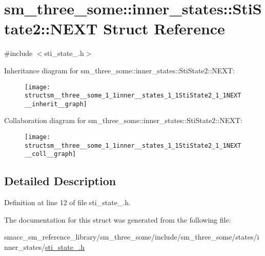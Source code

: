 \hypertarget{structsm__three__some_1_1inner__states_1_1StiState2_1_1NEXT}{}\section{sm\+\_\+three\+\_\+some\+:\+:inner\+\_\+states\+:\+:Sti\+State2\+:\+:N\+E\+XT Struct Reference}
\label{structsm__three__some_1_1inner__states_1_1StiState2_1_1NEXT}


{\ttfamily \#include $<$sti\+\_\+state\+\_.\+h$>$}



Inheritance diagram for sm\+\_\+three\+\_\+some\+:\+:inner\+\_\+states\+:\+:Sti\+State2\+:\+:N\+E\+XT\+:
\nopagebreak
\begin{figure}[H]
\begin{center}
\leavevmode
\texttt{[image: structsm\_\_three\_\_some\_1\_1inner\_\_states\_1\_1StiState2\_1\_1NEXT\_\_inherit\_\_graph]}
\end{center}
\end{figure}


Collaboration diagram for sm\+\_\+three\+\_\+some\+:\+:inner\+\_\+states\+:\+:Sti\+State2\+:\+:N\+E\+XT\+:
\nopagebreak
\begin{figure}[H]
\begin{center}
\leavevmode
\texttt{[image: structsm\_\_three\_\_some\_1\_1inner\_\_states\_1\_1StiState2\_1\_1NEXT\_\_coll\_\_graph]}
\end{center}
\end{figure}


\subsection{Detailed Description}


Definition at line 12 of file sti\+\_\+state\+\_.\+h.



The documentation for this struct was generated from the following file\+:\begin{DoxyCompactItemize}
\item 
smacc\+\_\+sm\+\_\+reference\+\_\+library/sm\+\_\+three\+\_\+some/include/sm\+\_\+three\+\_\+some/states/inner\+\_\+states/\hyperlink{sm__three__some_2include_2sm__three__some_2states_2inner__states_2sti__state__2_8h}{sti\+\_\+state\+\_.\+h}\end{DoxyCompactItemize}

